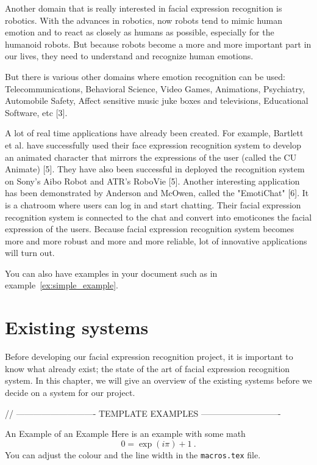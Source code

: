 Another domain that is really interested in facial expression recognition is robotics. With the advances in robotics, now robots tend to mimic human emotion and to react as closely as humans as possible, especially for the humanoid robots. But because robots become a more and more important part in our lives, they need to understand and recognize human emotions.

But there is various other domains where emotion recognition can be used: Telecommunications, Behavioral Science, Video Games, Animations, Psychiatry, Automobile Safety, Affect sensitive music juke boxes and televisions, Educational Software, etc [3].

A lot of real time applications have already been created. For example, Bartlett et al. have successfully used their face expression recognition system to develop an animated character that mirrors the expressions of the user (called the CU Animate) [5]. They have also been successful in deployed the recognition system on Sony's Aibo Robot and ATR's RoboVie [5]. Another interesting application has been demonstrated by Anderson and McOwen, called the "EmotiChat" [6]. It is a chatroom where users can log in and start chatting. Their facial expression recognition system is connected to the chat and convert into emoticones the facial expression of the users. Because facial expression recognition system becomes more and more robust and more and more reliable, lot of innovative applications will turn out.

You can also have examples in your document such as in example~\ref{ex:simple_example}.

\section{Existing systems}

Before developing our facial expression recognition project, it is important to know what already exist; the state of the art of facial expression recognition system. In this chapter, we will give an overview of the existing systems before we decide on a system for our project.

// ---------------------------- TEMPLATE EXAMPLES ---------------------------- 

\begin{example}{An Example of an Example}
  \label{ex:simple_example}
  Here is an example with some math
  \begin{equation}
    0 = \exp(i\pi)+1\ .
  \end{equation}
  You can adjust the colour and the line width in the {\tt macros.tex} file.
\end{example}

